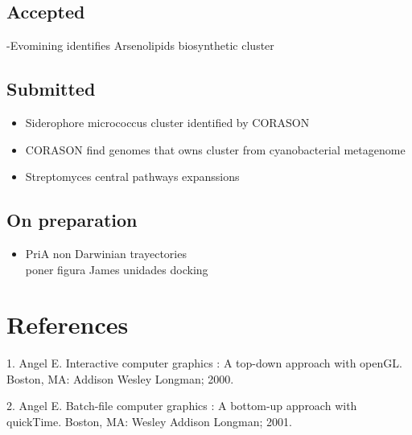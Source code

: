 \documentclass[12pt,twoside]{reedthesis}
\providecommand{\tightlist}{%
  \setlength{\itemsep}{0pt}\setlength{\parskip}{0pt}}
\begin{document}
  \section{Accepted}\label{accepted}
  
  -Evomining identifies Arsenolipids biosynthetic cluster
  
  \section{Submitted}\label{submitted}
  
  \begin{itemize}
  \tightlist
  \item
    Siderophore micrococcus cluster identified by CORASON\\
  \item
    CORASON find genomes that owns cluster from cyanobacterial
    metagenome\\
  \item
    Streptomyces central pathways expanssions
  \end{itemize}
  
  \section{On preparation}\label{on-preparation}
  
  \begin{itemize}
  \tightlist
  \item
    PriA non Darwinian trayectories\\
    poner figura James unidades docking
  \end{itemize}
  
  \backmatter
  
  \chapter{References}\label{references}
  
  \noindent
  
  \setlength{\parindent}{-0.20in} \setlength{\leftskip}{0.20in}
  \setlength{\parskip}{8pt}
  
  \hypertarget{refs}{}
  \hypertarget{ref-angel2000}{}
  1. Angel E. Interactive computer graphics : A top-down approach with
  openGL. Boston, MA: Addison Wesley Longman; 2000.
  
  \hypertarget{ref-angel2001}{}
  2. Angel E. Batch-file computer graphics : A bottom-up approach with
  quickTime. Boston, MA: Wesley Addison Longman; 2001.
  
\end{document}
